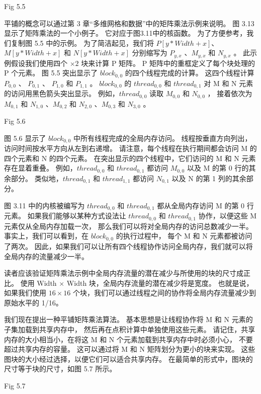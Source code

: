 {\color{red} Fig 5.5}

平铺的概念可以通过第 3 章“多维网格和数据”中的矩阵乘法示例来说明。 图 3.13 显示了矩阵乘法的一个小例子。 
它对应于图3.11中的核函数。 为了方便参考，我们复制图 5.5 中的示例。 
为了简洁起见，我们将 $P[y * Width+x]$、$M[y * Width+x]$ 和 $N[y * Width+x]$ 
分别缩写为 $P_{y,x}$ 、$M_{y, x}$ 和 $N_{y,x}$ 。 
此示例假设我们使用四个 $\times 2$ 块来计算 P 矩阵。 P 矩阵中的重框定义了每个块处理的 P 个元素。 
图 5.5 突出显示了 $block_{0,0}$ 的四个线程完成的计算。 
这四个线程计算 $P_{0,0}$ 、 $P_{0,1}$ 、 $P_{1,0}$ 和 $P_{1,1}$ 。 
$block_{0,0}$ 的 $thread_{0,0}$ 和 $thread_{0,1}$ 对 M 和 N 元素的访问用黑色箭头突出显示。 
例如，$thread_{0,0}$ 读取 $M_{0,0}$ 和 $N_{0,0}$ ，
接着依次为 $M_{0,1}$ 和 $N_{1,0}$ 、$M_{0,2}$ 和 $N_{2,0}$ 、$M_{0,3}$ 和 $N_{3,0}$ 。

{\color{red} Fig 5.6}

图 5.6 显示了 $block_{0,0}$ 中所有线程完成的全局内存访问。 线程按垂直方向列出，访问时间按水平方向从左到右递增。 
请注意，每个线程在执行期间都会访问 M 的四个元素和 N 的四个元素。 
在突出显示的四个线程中，它们访问的 M 和 N 元素存在显着重叠。 
例如，$thread_{0,0}$ 和 $thread_{0,1}$ 都访问 $M_{0,0}$ 以及 M 的第 0 行的其余部分。
类似地，$thread_{0,1}$ 和 $thread_{1,1}$ 都访问 $N_{0,1}$ 以及 N 的第 1 列的其余部分。

图 3.11 中的内核被编写为 $thread_{0,0}$ 和 $thread_{0,1}$ 都从全局内存访问 M 的第 0 行元素。 
如果我们能够以某种方式设法让 $thread_{0,0}$ 和 $thread_{0,1}$ 协作，以便这些 M 元素仅从全局内存加载一次，
那么我们可以将对全局内存的访问总数减少一半。 事实上，我们可以看到，在 $block_{0,0}$ 的执行过程中，
每个 M 和 N 元素都被访问了两次。 因此，如果我们可以让所有四个线程协作访问全局内存，我们就可以将全局内存的流量减少一半。

读者应该验证矩阵乘法示例中全局内存流量的潜在减少与所使用的块的尺寸成正比。 
使用 Width $\times$ Width 块，全局内存流量的潜在减少将是宽度。 
也就是说，如果我们使用 $16 \times 16$ 个块，我们可以通过线程之间的协作将全局内存流量减少到原始水平的 1/16。

我们现在提出一种平铺矩阵乘法算法。 基本思想是让线程协作将 M 和 N 元素的子集加载到共享内存中，
然后再在点积计算中单独使用这些元素。 请记住，共享内存的大小相当小，在将这 M 和 N 个元素加载到共享内存中时必须小心，
不要超过共享内存的容量。 这可以通过将 M 和 N 矩阵划分为更小的块来实现。 
这些图块的大小经过选择，以便它们可以适合共享内存。 在最简单的形式中，图块的尺寸等于块的尺寸，如图 5.7 所示。

{\color{red} Fig 5.7}

